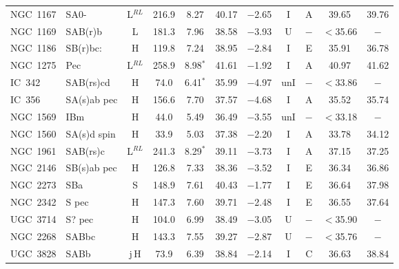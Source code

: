 \begin{center}
\begin{longtable}{lC{2.5cm}ccccccccc}
NGC~1167   & SA0-           &  L$^{RL}$              & 216.9 & 8.27            & 40.17    & $-$2.65  & I  & A     & 39.65    & 39.76           \\
NGC~1169  & SAB(r)b        &  L        & 181.3 & 7.96           & 38.58    & $-$3.93  &  U &$-$     &  $<$35.66  &    $-$       \\
NGC~1186  & SB(r)bc:       & H              & 119.8 & 7.24            & 38.95    & $-$2.84   &  I  & E     &  35.91   & 36.78         \\
NGC~1275  & Pec             & L$^{RL}$         & 258.9 & 8.98$^{*}$      & 41.61    & $-$1.92      &  I  & A     & 40.97   & 41.62           \\
IC~342       & SAB(rs)cd    & H               & 74.0  & 6.41$^{*}$      &  35.99 & $-$4.97   & unI &$-$     & $<$33.86 &   $-$         \\
IC~356       & SA(s)ab pec & H         & 156.6 & 7.70            & 37.57    & $-$4.68     & I   & A      & 35.52   & 35.74     \\
NGC~1569 & IBm            & H               & 44.0    & 5.49           & 36.49 & $-$3.55   & unI &$-$     & $<$33.18 & $-$         \\
NGC~1560 & SA(s)d spin & H               & 33.9  & 5.03           & 37.38    & $-$2.20  & I   & A      & 33.78    & 34.12      \\
NGC~1961  & SAB(rs)c      &  L$^{RL}$         & 241.3 & 8.29$^{*}$      & 39.11    & $-$3.73 & I   & A      & 37.15    & 37.25     \\
NGC~2146 & SB(s)ab pec  &  H              & 126.8 & 7.33           & 38.36    & $-$3.52   & I   & E      & 36.34    & 36.86      \\
NGC~2273  & SBa            &  S         &   148.9     &  7.61         &  40.43   & $-$1.77    &   I   & E     &  36.64   & 37.98  \\
NGC~2342  & S pec         & H         &   147.3    &  7.60           &  39.71   &  $-$2.48  &   I  & E     &  36.55   &  37.64  \\
UGC~3714 & S? pec           & H               & 104.0   & 6.99           & 38.49    & $-$3.05   & U  & $-$     & $<$35.90 & $-$         \\
NGC~2268  & SABbc        &   H         &    143.3   &  7.55          &  39.27   & $-$2.87   &  U &  $-$   &  $<$35.76  & $-$   \\
UGC~3828  & SABb        &    j\,H          &   73.9     & 6.39           &  38.84    &  $-$2.14  &  I  & C       & 36.63   & 38.84  \\

\end{longtable}
\end{center}
